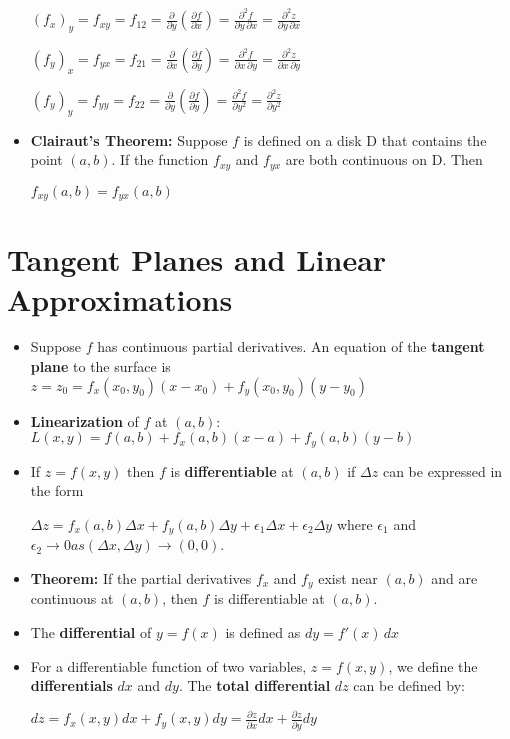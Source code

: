 \documentclass{report}
\begin{document}
\begin{itemize}
			\begin{center}
			\Large$(f_x)_y=f_{xy}=f_{12}=\frac{\partial}{\partial y}(\frac{\partial f}{\partial x})=\frac{\partial ^2f}{\partial y \,\partial x}=\frac{\partial ^2z}{\partial y \, \partial x}$
			\end{center}
			\begin{center}
			\Large$(f_y)_x=f_{yx}=f_{21}=\frac{\partial}{\partial x}(\frac{\partial f}{\partial y})=\frac{\partial ^2f}{\partial x \,\partial  y}=\frac{\partial ^2z}{\partial x \, \partial y}$
			\end{center}
			\begin{center}
			\Large$(f_y)_y=f_{yy}=f_{22}=\frac{\partial}{\partial y}(\frac{\partial f}{\partial y})=\frac{\partial ^2f}{\partial  y^2}=\frac{\partial ^2z}{\partial y^2}$
			\end{center}
			\item \textbf{Clairaut's Theorem:} Suppose $f$ is defined on a disk D that contains the point $(a,b)$. If the function $f_{xy}$ and $f_{yx}$ are both continuous on D. Then
			\begin{center}
			\Large$f_{xy}(a,b)=f_{yx}(a,b)$
			\end{center}
		\end{itemize}
	\section{Tangent Planes and Linear Approximations}
		\begin{itemize}\addtolength{\leftskip}{2em}
			\item Suppose $f$ has continuous partial derivatives. An equation of the\textbf{ tangent plane} to the surface is
			\subitem \Large$z=z_0=f_x(x_0,y_0)(x-x_0)+f_y(x_0,y_0)(y-y_0)$
			\large\item \textbf{Linearization} of $f$ at $(a,b)$:
				\subitem\Large $L(x,y)=f(a,b)+f_x(a,b)(x-a)+f_y(a,b)(y-b)$
			\large\item If $z=f(x,y)$ then $f$ is \textbf{differentiable} at $(a,b)$ if $\Delta z$ can be expressed in the form 
			\begin{center}
			$\Delta z=f_x(a,b)\Delta x+f_y(a,b)\Delta y+\epsilon_1\Delta x+\epsilon_2\Delta y$ where $\epsilon_1$ and $\epsilon_2 \rightarrow 0 as (\Delta x,\Delta y)\rightarrow (0,0)$.
			\end{center}
			\item \textbf{Theorem:} If the partial derivatives $f_x$ and $f_y$ exist near $(a,b)$ and are continuous at $(a,b)$, then $f$ is differentiable at $(a,b)$.
			\item The \textbf{differential} of $y=f(x)$ is defined as $dy=f'(x)\, dx$
			\item For a differentiable  function of two variables, $z=f(x,y)$, we define the \textbf{differentials} $dx$ and $dy$. The \textbf{total differential} $dz$ can be defined by:
				\begin{center}
				$dz=f_x(x,y)dx+f_y(x,y)dy=\frac{\partial z}{\partial x}dx+\frac{\partial z}{\partial y}dy$
				\end{center}
		\end{itemize}
\end{document}
